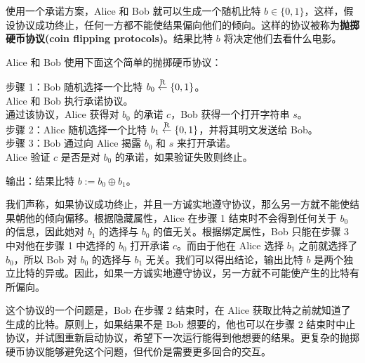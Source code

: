 \begin{snote}[抛掷硬币。]
使用一个承诺方案，Alice 和 Bob 就可以生成一个随机比特 $b\in\{0,1\}$，这样，假设协议成功终止，任何一方都不能使结果偏向他们的倾向。这样的协议被称为\textbf{抛掷硬币协议(coin flipping protocols)}。结果比特 $b$ 将决定他们去看什么电影。

Alice 和 Bob 使用下面这个简单的抛掷硬币协议：

\vspace*{5pt}

\hspace*{5pt} 步骤 1：Bob 随机选择一个比特 $b_0\overset{\rm R}\leftarrow\{0,1\}$。\\
\hspace*{50pt} Alice 和 Bob 执行承诺协议。\\
\hspace*{50pt} 通过该协议，Alice 获得对 $b_0$ 的承诺 $c$，Bob 获得一个打开字符串 $s$。\\
\hspace*{26pt} 步骤 2：Alice 随机选择一个比特 $b_1\overset{\rm R}\leftarrow\{0,1\}$，并将其明文发送给 Bob。\\
\hspace*{26pt} 步骤 3：Bob 通过向 Alice 揭露 $b_0$ 和 $s$ 来打开承诺。\\
\hspace*{50pt} Alice 验证 $c$ 是否是对 $b_0$ 的承诺，如果验证失败则终止。

\vspace*{3pt}

\hspace*{5pt} 输出：结果比特 $b:=b_0\oplus b_1$。

\vspace*{5pt}

\noindent
我们声称，如果协议成功终止，并且一方诚实地遵守协议，那么另一方就不能使结果朝他的倾向偏移。根据隐藏属性，Alice 在步骤 1 结束时不会得到任何关于 $b_0$ 的信息，因此她对 $b_1$ 的选择与 $b_0$ 的值无关。根据绑定属性，Bob 只能在步骤 3 中对他在步骤 1 中选择的 $b_0$ 打开承诺 $c$。而由于他在 Alice 选择 $b_1$ 之前就选择了 $b_0$，所以 Bob 对 $b_0$ 的选择与 $b_1$ 无关。我们可以得出结论，输出比特 $b$ 是两个独立比特的异或。因此，如果一方诚实地遵守协议，另一方就不可能使产生的比特有所偏向。

这个协议的一个问题是，Bob 在步骤 2 结束时，在 Alice 获取比特之前就知道了生成的比特。原则上，如果结果不是 Bob 想要的，他也可以在步骤 2 结束时中止协议，并试图重新启动协议，希望下一次运行能得到他想要的结果。更复杂的抛掷硬币协议能够避免这个问题，但代价是需要更多回合的交互。
\end{snote}

